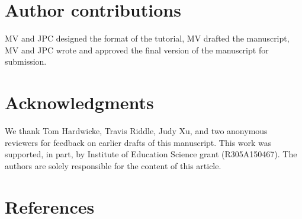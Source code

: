 \documentclass[
  american,
  ,doc,floatsintext]{apa6}
\begin{document}
\hypertarget{author-contributions}{%
\section{Author contributions}\label{author-contributions}}

MV and JPC designed the format of the tutorial, MV drafted the manuscript, MV and JPC wrote and approved the final version of the manuscript for submission.

\hypertarget{acknowledgments}{%
\section{Acknowledgments}\label{acknowledgments}}

We thank Tom Hardwicke, Travis Riddle, Judy Xu, and two anonymous reviewers for feedback on earlier drafts of this manuscript. This work was supported, in part, by Institute of Education Science grant (R305A150467). The authors are solely responsible for the content of this article.

\newpage

\hypertarget{references}{%
\section{References}\label{references}}

\setlength{\parindent}{-0.5in}
\setlength{\leftskip}{0.5in}
\end{document}
